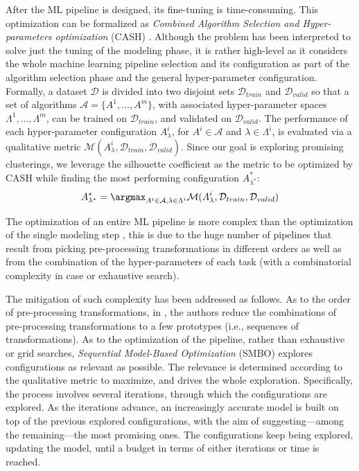 
After the ML pipeline is designed, its fine-tuning is time-consuming. 
This optimization can be formalized as \textit{Combined Algorithm Selection and Hyper-parameters optimization} (CASH) \cite{thornton2013auto}.
Although the problem has been interpreted to solve just the tuning of the modeling phase, it is rather high-level as it considers the whole machine learning pipeline selection and its configuration as part of the algorithm selection phase and the general hyper-parameter configuration.
Formally, a dataset $\mathcal{D}$ is divided into two disjoint sets $\mathcal{D}_{train}$ and $\mathcal{D}_{valid}$ so that a set of algorithms $\mathcal{A} = \{A^1, \dots, A^m\}$, with associated hyper-parameter spaces $\Lambda^1, \dots, \Lambda^m$, can be trained on $\mathcal{D}_{train}$, and validated on $\mathcal{D}_{valid}$.
The performance of each hyper-parameter configuration $A^{i}_{\lambda}$, for $A^{i} \in \mathcal{A}$ and $\lambda \in \Lambda^{i}$, is evaluated via a qualitative metric $\mathcal{M}(A^{i}_{\lambda}, \mathcal{D}_{train}, \mathcal{D}_{valid})$.
Since our goal is exploring promising clusterings, we leverage the silhouette coefficient as the metric to be optimized by CASH while finding the most performing configuration $A^{\ast}_{\lambda^{\ast}}$:
\begin{align*}
    A^{\ast}_{\lambda^{\ast}} = \argmax_{A^{i} \in \mathcal{A}, \lambda \in \Lambda^{i}} \mathcal{M}(A^{i}_{\lambda}, \mathcal{D}_{train}, \mathcal{D}_{valid})
\end{align*}

The optimization of an entire ML pipeline \cite{thornton2013auto,quemy2019data} is more complex than the optimization of the single modeling step \cite{hutter2011sequential}, this is due to the huge number of pipelines that result from picking pre-processing transformations in different orders as well as from the combination of the hyper-parameters of each task (with a combinatorial complexity in case or exhaustive search).

The mitigation of such complexity has been addressed as follows.
As to the order of pre-processing transformations, in \cite{DBLP:conf/dolap/GiovanelliBA21}, the authors reduce the combinations of pre-processing transformations to a few prototypes (i.e., sequences of transformations).
As to the optimization of the pipeline, rather than exhaustive or grid searches, \textit{Sequential Model-Based Optimization} (SMBO) explores configurations as relevant as possible.
The relevance is determined according to the qualitative metric to maximize, and drives the whole exploration.
Specifically, the process involves several iterations, through which the configurations are explored.
As the iterations advance, an increasingly accurate model is built on top of the previous explored configurations, with the aim of suggesting---among the remaining---the most promising ones.
The configurations keep being explored, updating the model, until a budget in terms of either iterations or time is reached.

